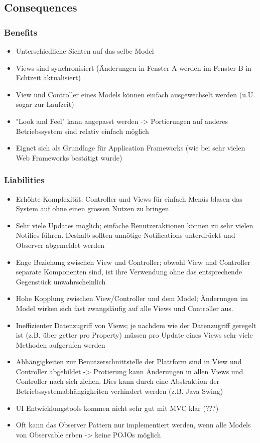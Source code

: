 \subsection*{Consequences}


\subsubsection*{Benefits}


\begin{itemize}
	\item Unterschiedliche Sichten auf das selbe Model
	\item Views sind synchronisiert (Änderungen in Fenster A werden im Fenster B in Echtzeit aktualisiert)
	\item View und Controller eines Models können einfach ausgewechselt werden (u.U. sogar zur Laufzeit)
	\item "Look and Feel" kann angepasst werden -> Portierungen auf anderes Betriebssystem sind relativ einfach möglich
	\item Eignet sich als Grundlage für Application Frameworks (wie bei sehr vielen Web Frameworks bestätigt wurde)
\end{itemize}

\subsubsection*{Liabilities}


\begin{itemize}
	\item Erhöhte Komplexität; Controller und Views für einfach Menüs blasen das System auf ohne einen grossen Nutzen zu bringen
	\item Sehr viele Updates möglich; einfache Benutzeraktionen können zu sehr vielen Notifies führen. Deshalb sollten unnötige Notifications unterdrückt und Observer abgemeldet werden
	\item Enge Beziehung zwischen View und Controller; obwohl View und Controller separate Komponenten sind, ist ihre Verwendung ohne das entsprechende Gegenstück unwahrscheinlich
	\item Hohe Kopplung zwischen View/Controller und dem Model; Änderungen im Model wirken sich fast zwangsläufig auf alle Views und Controller aus.
	\item Ineffizienter Datenzugriff von Views; je nachdem wie der Datenzugriff geregelt ist (z.B. über getter pro Property) müssen pro Update eines Views sehr viele Methoden aufgerufen werden
	\item Abhängigkeiten zur Benutzerschnittstelle der Plattform sind in View und Controller abgebildet -> Protierung kann Änderungen in allen Views und Controller nach sich ziehen. Dies kann durch eine Abstraktion der Betriebssystemabhängigkeiten verhindert werden (z.B. Java Swing)
	\item UI Entwicklungstools kommen nicht sehr gut mit MVC klar (???)
	\item Oft kann das Observer Pattern nur implementiert werden, wenn alle Models von Observable erben -> keine POJOs möglich
\end{itemize}

